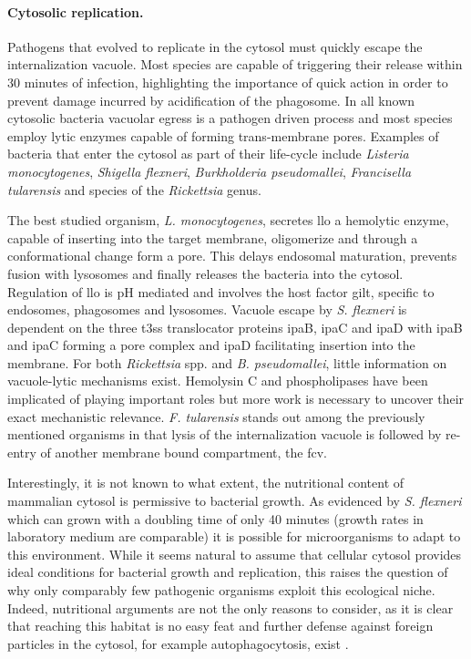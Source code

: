 \paragraph{Cytosolic replication.}
Pathogens that evolved to replicate in the cytosol must quickly escape the internalization vacuole. Most species are capable of triggering their release within 30 minutes of infection, highlighting the importance of quick action in order to prevent damage incurred by acidification of the phagosome. In all known cytosolic bacteria vacuolar egress is a pathogen driven process and most species employ lytic enzymes capable of forming trans-membrane pores. Examples of bacteria that enter the cytosol as part of their life-cycle include \textit{Listeria monocytogenes}, \textit{Shigella flexneri}, \textit{Burkholderia pseudomallei}, \textit{Francisella tularensis} and species of the \textit{Rickettsia} genus.

The best studied organism, \textit{L. monocytogenes}, secretes \gls{llo} a hemolytic enzyme, capable of inserting into the target membrane, oligomerize and through a conformational change form a pore. This delays endosomal maturation, prevents fusion with lysosomes and finally releases the bacteria into the cytosol. Regulation of \gls{llo} is pH mediated and involves the host factor \gls{gilt}, specific to endosomes, phagosomes and lysosomes. Vacuole escape by \textit{S. flexneri} is dependent on the three \gls{t3ss} translocator proteins \gls{ipa}B, \gls{ipa}C and \gls{ipa}D with \gls{ipa}B and \gls{ipa}C forming a pore complex and \gls{ipa}D facilitating insertion into the membrane. For both \textit{Rickettsia} spp. and \textit{B. pseudomallei}, little information on vacuole-lytic mechanisms exist. Hemolysin C and phospholipases have been implicated of playing important roles but more work is necessary to uncover their exact mechanistic relevance. \textit{F. tularensis} stands out among the previously mentioned organisms in that lysis of the internalization vacuole is followed by re-entry of another membrane bound compartment, the \gls{fcv}.

Interestingly, it is not known to what extent, the nutritional content of mammalian cytosol is permissive to bacterial growth. As evidenced by \textit{S. flexneri} which can grown with a doubling time of only 40 minutes (growth rates in laboratory medium are comparable) it is possible for microorganisms to adapt to this environment. While it seems natural to assume that cellular cytosol provides ideal conditions for bacterial growth and replication, this raises the question of why only comparably few pathogenic organisms exploit this ecological niche. Indeed, nutritional arguments are not the only reasons to consider, as it is clear that reaching this habitat is no easy feat and further defense against foreign particles in the cytosol, for example autophagocytosis, exist \citep{Ray2009}.

